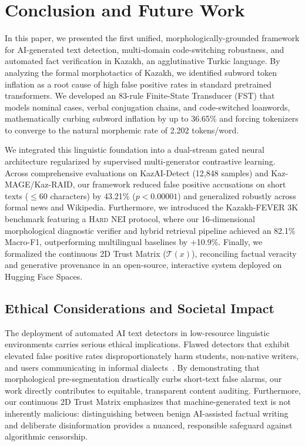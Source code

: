 \section{Conclusion and Future Work}
\label{sec:conclusion_and_future_work}

In this paper, we presented the first unified, morphologically-grounded framework for AI-generated text detection, multi-domain code-switching robustness, and automated fact verification in Kazakh, an agglutinative Turkic language. By analyzing the formal morphotactics of Kazakh, we identified subword token inflation as a root cause of high false positive rates in standard pretrained transformers. We developed an 83-rule Finite-State Transducer (FST) that models nominal cases, verbal conjugation chains, and code-switched loanwords, mathematically curbing subword inflation by up to 36.65\% and forcing tokenizers to converge to the natural morphemic rate of 2.202 tokens/word.

We integrated this linguistic foundation into a dual-stream gated neural architecture regularized by supervised multi-generator contrastive learning. Across comprehensive evaluations on KazAI-Detect (12,848 samples) and Kaz-MAGE/Kaz-RAID, our framework reduced false positive accusations on short texts ($\le 60$ characters) by 43.21\% ($p < 0.00001$) and generalized robustly across formal news and Wikipedia. Furthermore, we introduced the Kazakh-FEVER 3K benchmark featuring a \textsc{Hard NEI} protocol, where our 16-dimensional morphological diagnostic verifier and hybrid retrieval pipeline achieved an 82.1\% Macro-F1, outperforming multilingual baselines by +10.9\%. Finally, we formalized the continuous 2D Trust Matrix ($\mathcal{T}(x)$), reconciling factual veracity and generative provenance in an open-source, interactive system deployed on Hugging Face Spaces.

\subsection{Ethical Considerations and Societal Impact}
The deployment of automated AI text detectors in low-resource linguistic environments carries serious ethical implications. Flawed detectors that exhibit elevated false positive rates disproportionately harm students, non-native writers, and users communicating in informal dialects~\citep{liang2023gptdetectors}. By demonstrating that morphological pre-segmentation drastically curbs short-text false alarms, our work directly contributes to equitable, transparent content auditing. Furthermore, our continuous 2D Trust Matrix emphasizes that machine-generated text is not inherently malicious: distinguishing between benign AI-assisted factual writing and deliberate disinformation provides a nuanced, responsible safeguard against algorithmic censorship.

